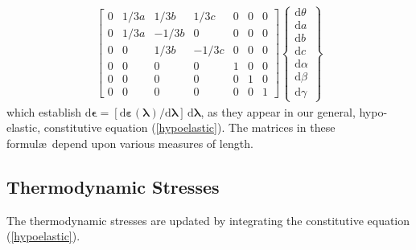 \begin{subequations}
\begin{align}
\begin{bmatrix}
    0 & 1/3a & 1/3b & 1/3c & 0 & 0 & 0 \\ 
    0 & 1/3a & -1/3b & 0 & 0 & 0 & 0 \\ 
    0 & 0 & 1/3b & -1/3c & 0 & 0 & 0 \\
    0 & 0 & 0 & 0 & 1 & 0 & 0 \\
    0 & 0 & 0 & 0 & 0 & 1 & 0 \\
    0 & 0 & 0 & 0 & 0 & 0 & 1
    \end{bmatrix} \left\{ \begin{matrix}
    \mathrm{d} \theta \\ \mathrm{d} a \\ \mathrm{d} b \\ 
    \mathrm{d} c \\ \mathrm{d} \alpha \\ \mathrm{d} \beta \\ \mathrm{d} \gamma
    \end{matrix} \right\}
    \end{align}
\end{subequations}
which establish $\mathrm{d} \boldsymbol{\epsilon} = [ \mathrm{d} \boldsymbol{\varepsilon} ( \boldsymbol{\lambda} ) / \mathrm{d} \boldsymbol{\lambda} ] \, \mathrm{d} \boldsymbol{\lambda}$, as they appear in our general, hypo-elastic, constitutive equation (\ref{hypoelastic}).  The matrices in these formul\ae\ depend upon various measures of length.

\subsection{Thermodynamic Stresses}

The thermo\-dynamic stresses are updated by integrating the constitutive equation (\ref{hypoelastic}).  

